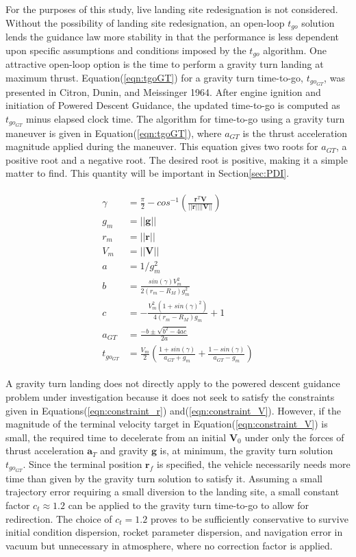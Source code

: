For the purposes of this study, live landing site redesignation is not considered. Without the possibility of landing site redesignation, an open-loop $t_{go}$ solution lends the guidance law more stability in that the performance is less dependent upon specific assumptions and conditions imposed by the $t_{go}$ algorithm. One attractive open-loop option is the time to perform a gravity turn landing at maximum thrust. Equation\:(\ref{eqn:tgoGT}) for a gravity turn time-to-go, $t_{go_{GT}}$, was presented in Citron, Dunin, and Meissinger 1964\:\cite{CITRON}. After engine ignition and initiation of Powered Descent Guidance, the updated time-to-go is computed as $t_{go_{GT}}$ minus elapsed clock time. The algorithm for time-to-go using a gravity turn maneuver is given in Equation\:(\ref{eqn:tgoGT}), where $a_{GT}$ is the thrust acceleration magnitude applied during the maneuver. This equation gives two roots for $a_{GT}$, a positive root and a negative root. The desired root is positive, making it a simple matter to find. This quantity will be important in Section\:\ref{sec:PDI}.

\begin{align}
\label{eqn:tgoGT}
\begin{split}
\gamma &= \frac{\pi}{2} - cos^{-1}\left(\frac{\bm{r}^T\bm{V}}{||\bm{r}||||\bm{V} ||} \right) \\
g_m &= ||\bm{g}|| \\
r_m &= ||\bm{r}|| \\
V_m &= ||\bm{V}|| \\
a &= 1/g_m^2 \\
b &= \frac{sin(\gamma)V_m^2}{2(r_m-R_M)g_m^2} \\
c &= -\frac{V_m^2 (1+sin(\gamma)^2)}{4(r_m - R_M)g_m}+1 \\
a_{GT} &= \frac{-b \pm \sqrt{b^2 - 4 a c}}{2 a} \\
t_{go_{GT}} &= \frac{V_m}{2} \left(\frac{1+sin(\gamma)}{a_{GT} + g_m} + \frac{1-sin(\gamma)}{a_{GT} - g_m} \right)
\end{split}
\end{align}

A gravity turn landing does not directly apply to the powered descent guidance problem under investigation because it does not seek to satisfy the constraints given in Equations\:(\ref{eqn:constraint_r}) and\:(\ref{eqn:constraint_V}). However, if the magnitude of the terminal velocity target in Equation\:(\ref{eqn:constraint_V}) is small, the required time to decelerate from an initial $\bm{V}_0$ under only the forces of thrust acceleration $\bm{a}_T$ and gravity $\bm{g}$ is, at minimum, the gravity turn solution $t_{go_{GT}}$. Since the terminal position $\bm{r}_f$ is specified, the vehicle necessarily needs more time than given by the gravity turn solution to satisfy it. Assuming a small trajectory error requiring a small diversion to the landing site, a small constant factor $ c_t \approx 1.2$ can be applied to the gravity turn time-to-go to allow for redirection. The choice of $c_t = 1.2$ proves to be sufficiently conservative to survive initial condition dispersion, rocket parameter dispersion, and navigation error in vacuum but unnecessary in atmosphere, where no correction factor is applied. 

